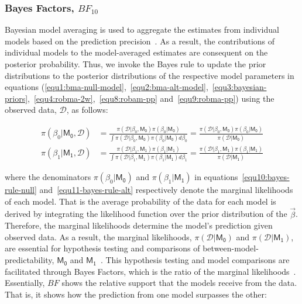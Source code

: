 \documentclass[a4paper, 12pt]{article}
\begin{document}
    \subsubsection{Bayes Factors, $BF_{10}$}\label{subsubsec2.3.2:bayes-factors-$bf_{10}$}
    Bayesian model averaging is used to aggregate the estimates from individual models based on the prediction precision~\parencites{hinne2020, hoeting1999, leamer1978}. As a result, the contributions of individual models to the model-averaged estimates are consequent on the posterior probability. Thus, we invoke the Bayes rule to update the prior distributions to the posterior distributions of the respective model parameters in equations (\ref{equ1:bma-null-model},~\ref{equ2:bma-alt-model},~\ref{equ3:bayesian-priors},~\ref{equ4:robma-2w},~\ref{equ8:robam-pp} and~\ref{equ9:robma-pp}) using the observed data, $\mathcal{D}$, as follows:

    \begin{align}
        \pi(\beta_0 | \mathsf{M_0}, \mathcal{D}) &= \frac{\pi(\mathcal{D} | \beta_0, \mathsf{M_0}) \pi(\beta_0 | \mathsf{M_0})}{\int\pi(\mathcal{D} | \beta_0, \mathsf{M_0}) \pi(\beta_0 | \mathsf{M_0}) d\beta_0} = \frac{\pi(\mathcal{D} | \beta_0, \mathsf{M_0}) \pi(\beta_0 | \mathsf{M_0})}{\pi(\mathcal{D} | \mathsf{M_0})} \label{equ10:bayes-rule-null} \\
        \pi(\beta_1 | \mathsf{M_1}, \mathcal{D}) &= \frac{\pi(\mathcal{D} | \beta_1, \mathsf{M_1})\pi(\beta_1 | \mathsf{M_1})}{\int\pi(\mathcal{D} | \beta_1, \mathsf{M_1}) \pi(\beta_1|\mathsf{M_1}) d\beta_1} = \frac{\pi(\mathcal{D} | \beta_1, \mathsf{M_1}) \pi(\beta_1 | \mathsf{M_1})}{\pi(\mathcal{D} | \mathsf{M_1})} \label{equ11-bayes-rule-alt}
    \end{align}

    where the denominators $\pi(\beta_0 | \mathsf{M_0})$ and $\pi(\beta_1 | \mathsf{M_1})$ in equations~\ref{equ10:bayes-rule-null} and~\ref{equ11-bayes-rule-alt} respectively denote the marginal likelihoods of each model. That is the average probability of the data for each model is derived by integrating the likelihood function over the prior distribution of the $\vec{\beta}$. Therefore, the marginal likelihoods determine the model's prediction given observed data. As a result, the marginal likelihoods, $\pi(\mathcal{D}  |\mathsf{M_0})$ and $\pi(\mathcal{D} | \mathsf{M_1})$, are essential for hypothesis testing and comparisons of between-model-predictability, $\mathsf{M_0}$ and $\mathsf{M_1}$~\parencite{jefferysberger1992}. This hypothesis testing and model comparisons are facilitated through Bayes Factors, which is the ratio of the marginal likelihoods~\parencites{roudermorey2019, etzwagenmakers2017, kassraftery1995, wrinchjeffreys1921}. Essentially, $BF$ shows the relative support that the models receive from the data. That is, it shows how the prediction from one model surpasses the other:
\end{document}
